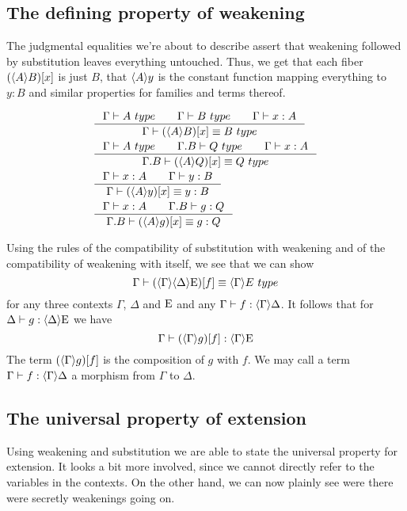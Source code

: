 \subsection{The defining property of weakening}
The judgmental equalities we're about to describe assert that weakening followed
by substitution leaves everything untouched. Thus, we get that each fiber
$\subst{x}{\ctxwk{A}{B}}$ is just $B$, that $\ctxwk{A}{y}$ is the constant function
mapping everything to $y:B$ and similar properties for families and terms thereof.

\begin{align}
& \inference{\jtype{\Gamma}{A}\qquad\jtype{\Gamma}{B}\qquad\jterm{\Gamma}{A}{x}}{\jtypeeq{\Gamma}{\subst{x}{\ctxwk{A}{B}}}{B}}\\
& \inference{\jtype{\Gamma}{A}\qquad\jtype{\ctxext{\Gamma}{B}}{Q}\qquad\jterm{\Gamma}{A}{x}}{\jtypeeq{\ctxext{\Gamma}{B}}{\subst{x}{\ctxwk{A}{Q}}}{Q}}\\
& \inference{\jterm{\Gamma}{A}{x}\qquad\jterm{\Gamma}{B}{y}}{\jtermeq{\Gamma}{B}{\subst{x}{\ctxwk{A}{y}}}{y}}\\
& \inference{\jterm{\Gamma}{A}{x}\qquad\jterm{\ctxext{\Gamma}{B}}{Q}{g}}{\jtermeq{\ctxext{\Gamma}{B}}{Q}{\subst{x}{\ctxwk{A}{g}}}{g}}
\end{align}

Using the rules of the compatibility of substitution with weakening and of the
compatibility of weakening with itself, we see that we can show
\begin{equation*}
\jtypeeq{\Gamma}{\subst{f}{\ctxwk{\Gamma}{{\Delta}{\greek{E}}}}}{\ctxwk{\Gamma}{E}}
\end{equation*}
for any three contexts $\Gamma$, $\Delta$ and $\mathrm{E}$ and any $\jhom{\Gamma}{\Delta}{f}$.
It follows that for $\jhom{\Delta}{\greek{E}}{g}$ we have
\begin{equation*}
\jhom{\Gamma}{\greek{E}}{\subst{f}{\ctxwk{\Gamma}{g}}}
\end{equation*}
The term $\jcomp{\Gamma}{f}{g}$ is the composition of $g$ with $f$. We may call
a term $\jhom{\Gamma}{\Delta}{f}$ a morphism from $\Gamma$ to $\Delta$.

\subsection{The universal property of extension}

Using weakening and substitution we are able to state the universal property
for extension. It looks a bit more involved, since we cannot directly refer
to the variables in the contexts. On the other hand, we can now plainly see
were there were secretly weakenings going on.

